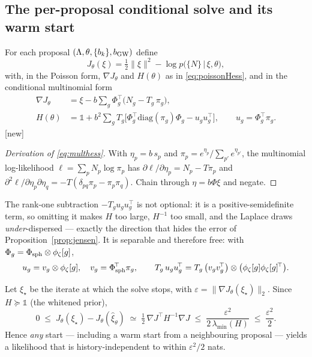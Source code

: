 \subsection{The per-proposal conditional solve and its warm start}
\label{sec:solve}

For each proposal $(\Lambda,\theta,\{b_k\},b_{\rm GW})$ define
\begin{equation}
  J_\theta(\xi)=\tfrac12\|\xi\|^2-\log p\big(\{N\}\,\big|\,\xi,\theta\big),
\end{equation}
with, in the Poisson form, $\nabla J_\theta$ and $H(\theta)$ as in
\eqref{eq:poissonHess}, and in the conditional multinomial form
\begin{align}
  \nabla J_\theta &= \xi-b\sum_g\Phi_g^{\!\top}\big(N_g-T_g\,\pi_g\big),
  \label{eq:multgrad}\\
  H(\theta) &= \mathbb 1+b^2\sum_g T_g\Big[\Phi_g^{\!\top}\mathrm{diag}(\pi_g)\Phi_g
              -u_gu_g^{\!\top}\Big],\qquad u_g=\Phi_g^{\!\top}\pi_g .
  \label{eq:multhess}
\end{align}
\hfill[new]

\begin{proof}[Derivation of \eqref{eq:multhess}]
With $\eta_p=b\,s_p$ and $\pi_p=e^{\eta_p}/\sum_{p'}e^{\eta_{p'}}$, the
multinomial log-likelihood $\ell=\sum_pN_p\log\pi_p$ has
$\partial\ell/\partial\eta_p=N_p-T\pi_p$ and
$\partial^2\ell/\partial\eta_p\partial\eta_q=-T(\delta_{pq}\pi_p-\pi_p\pi_q)$.
Chain through $\eta=b\Phi\xi$ and negate.
\end{proof}

The rank-one subtraction $-T_gu_gu_g^{\!\top}$ is not optional: it is a
positive-semidefinite term, so omitting it makes $H$ too large, $H^{-1}$ too
small, and the Laplace draws \emph{under}-dispersed --- exactly the direction
that hides the error of Proposition~\ref{prop:jensen}.  It is separable and
therefore free: with $\Phi_g=\Phi_{\rm sph}\otimes\phi_\zeta[g]$,
\begin{equation}
  u_g=v_g\otimes\phi_\zeta[g],\quad v_g=\Phi_{\rm sph}^{\!\top}\pi_g,
  \qquad
  T_g\,u_gu_g^{\!\top}=T_g\,\big(v_gv_g^{\!\top}\big)\otimes
  \big(\phi_\zeta[g]\phi_\zeta[g]^{\!\top}\big).
\end{equation}

\begin{proposition}
\label{prop:warmstart}
Let $\xi_\star$ be the iterate at which the solve stops, with
$\varepsilon=\|\nabla J_\theta(\xi_\star)\|_2$.  Since $H\succeq\mathbb 1$
(the whitened prior),
\begin{equation}
  0\;\le\;J_\theta(\xi_\star)-J_\theta(\hat\xi_\theta)
  \;\simeq\;\tfrac12\,\nabla J^{\!\top}H^{-1}\nabla J
  \;\le\;\frac{\varepsilon^2}{2\,\lambda_{\min}(H)}
  \;\le\;\frac{\varepsilon^2}{2}.
  \label{eq:warmbound}
\end{equation}
Hence \emph{any} start --- including a warm start from a neighbouring proposal
--- yields a likelihood that is history-independent to within
$\varepsilon^2/2$ nats.
\end{proposition}


